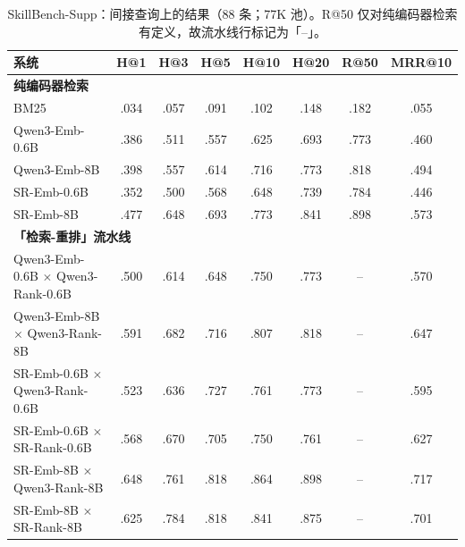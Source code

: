 \documentclass[11pt,UTF8,fontset=fandol]{ctexart}
\begin{document}
\begin{table}[H]\centering
\caption{SkillBench-Supp：间接查询上的结果（88 条；77K 池）。R@50 仅对纯编码器检索有定义，故流水线行标记为「--」。}
\small
\begin{tabular}{lccccccc}
\toprule
系统 & H@1 & H@3 & H@5 & H@10 & H@20 & R@50 & MRR@10 \\ \midrule
\multicolumn{8}{l}{\textbf{纯编码器检索}} \\
BM25 & .034 & .057 & .091 & .102 & .148 & .182 & .055 \\
Qwen3-Emb-0.6B & .386 & .511 & .557 & .625 & .693 & .773 & .460 \\
Qwen3-Emb-8B & .398 & .557 & .614 & .716 & .773 & .818 & .494 \\
SR-Emb-0.6B & .352 & .500 & .568 & .648 & .739 & .784 & .446 \\
SR-Emb-8B & .477 & .648 & .693 & .773 & .841 & .898 & .573 \\
\multicolumn{8}{l}{\textbf{「检索-重排」流水线}} \\
Qwen3-Emb-0.6B $\times$ Qwen3-Rank-0.6B & .500 & .614 & .648 & .750 & .773 & -- & .570 \\
Qwen3-Emb-8B $\times$ Qwen3-Rank-8B & .591 & .682 & .716 & .807 & .818 & -- & .647 \\
SR-Emb-0.6B $\times$ Qwen3-Rank-0.6B & .523 & .636 & .727 & .761 & .773 & -- & .595 \\
SR-Emb-0.6B $\times$ SR-Rank-0.6B & .568 & .670 & .705 & .750 & .761 & -- & .627 \\
SR-Emb-8B $\times$ Qwen3-Rank-8B & .648 & .761 & .818 & .864 & .898 & -- & .717 \\
SR-Emb-8B $\times$ SR-Rank-8B & .625 & .784 & .818 & .841 & .875 & -- & .701 \\
\bottomrule
\end{tabular}
\label{tab:28}
\end{table}
\end{document}
